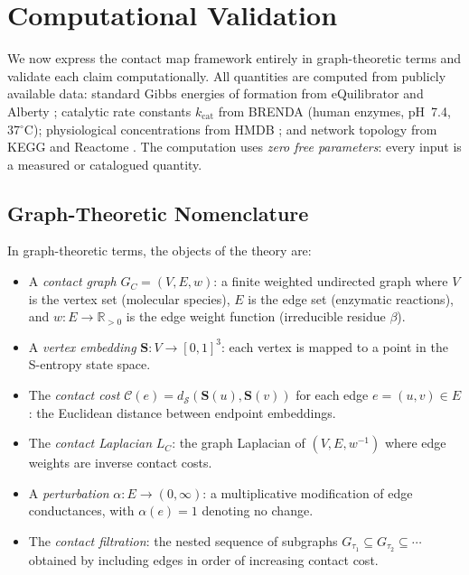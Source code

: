 \documentclass[11pt,twocolumn]{article}
\theoremstyle{plain}
\theoremstyle{definition}
\newcommand{\CC}{\mathcal{C}}
\newcommand{\bS}{\mathbf{S}}
\newcommand{\dS}{d_{\mathcal{S}}}
\newcommand{\reals}{\mathbb{R}}
\begin{document}
\section{Computational Validation}
\label{sec:applications}

We now express the contact map framework entirely in graph-theoretic terms and
validate each claim computationally. All quantities are computed from publicly
available data: standard Gibbs energies of formation from eQuilibrator
\cite{noor2014pathway} and Alberty \cite{alberty2003thermodynamics}; catalytic
rate constants $k_{\text{cat}}$ from BRENDA \cite{schomburg2004brenda} (human
enzymes, pH~7.4, 37$^\circ$C); physiological concentrations from HMDB
\cite{wishart2018hmdb}; and network topology from KEGG \cite{kanehisa2000kegg}
and Reactome \cite{jassal2020reactome}. The computation uses \emph{zero free
parameters}: every input is a measured or catalogued quantity.

\subsection{Graph-Theoretic Nomenclature}

In graph-theoretic terms, the objects of the theory are:
\begin{itemize}
\item A \emph{contact graph} $G_C = (V, E, w)$: a finite weighted undirected
  graph where $V$ is the vertex set (molecular species), $E$ is the edge set
  (enzymatic reactions), and $w: E \to \reals_{>0}$ is the edge weight function
  (irreducible residue $\beta$).
\item A \emph{vertex embedding} $\bS: V \to [0,1]^3$: each vertex is mapped to
  a point in the S-entropy state space.
\item The \emph{contact cost} $\CC(e) = \dS(\bS(u), \bS(v))$ for each edge
  $e = (u,v) \in E$: the Euclidean distance between endpoint embeddings.
\item The \emph{contact Laplacian} $L_C$: the graph Laplacian of $(V, E,
  w^{-1})$ where edge weights are inverse contact costs.
\item A \emph{perturbation} $\alpha: E \to (0, \infty)$: a multiplicative
  modification of edge conductances, with $\alpha(e) = 1$ denoting no change.
\item The \emph{contact filtration}: the nested sequence of subgraphs
  $G_{\tau_1} \subseteq G_{\tau_2} \subseteq \cdots$ obtained by including
  edges in order of increasing contact cost.
\end{itemize}
\end{document}
